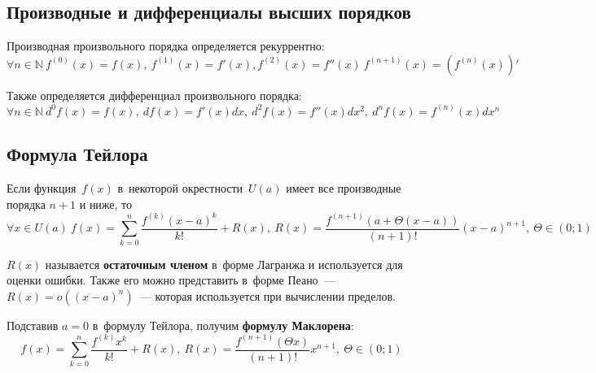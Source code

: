 \subsection{Производные и дифференциалы высших порядков}
Производная произвольного порядка определяется рекуррентно:
\begin{equation*}
\forall n \in \mathbb N \ f^{(0)}(x) = f(x), \ f^{(1)}(x) = f'(x), f^{(2)}(x) = f''(x) \ f^{(n + 1)}(x) = (f^{(n)}(x))'
\end{equation*}

Также определяется дифференциал произвольного порядка:
\begin{equation*}
\forall n \in \mathbb N \ d^0 f(x) = f(x), \ df(x) = f'(x)dx, \ d^2 f(x) = f''(x) dx^2, \ d^n f(x) = f^{(n)}(x) dx^n
\end{equation*}

\subsection{Формула Тейлора}
\begin{theorem}
\label{eq:Taylor_series}
Если функция~$f(x)$ в~некоторой окрестности~$U(a)$ имеет все производные порядка $n + 1$ и ниже, то
\begin{equation*}
\forall x \in U(a) \
f(x) = \sum_{k=0}^n \frac{f^{(k)} (x - a)^k}{k!} + R(x), \
R(x) = \frac{f^{(n + 1)}(a + \Theta(x - a))}{(n + 1)!}(x - a)^{n + 1}, \
\Theta \in (0; 1)
\end{equation*}
\end{theorem}

$R(x)$ называется \textbf{остаточным членом} в~форме Лагранжа и используется для оценки ошибки. Также его можно представить в~форме Пеано~--- $R(x) = o((x - a)^n)$~--- которая используется при вычислении пределов.

Подставив $a = 0$ в~формулу Тейлора, получим \textbf{формулу Маклорена}:
\begin{equation}
\label{eq:Maclaurin_series}
f(x) = \sum_{k=0}^n \frac{f^{(k)} x^k}{k!} + R(x), \
R(x) = \frac{f^{(n + 1)}(\Theta x)}{(n + 1)!} x^{n + 1}, \
\Theta \in (0; 1)
\end{equation}

